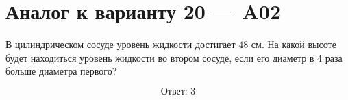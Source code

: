 \documentclass[12pt,a4paper]{article}
\begin{document}
\section*{Аналог к варианту 20 — A02}

В цилиндрическом сосуде уровень жидкости достигает \(48\) см. На какой высоте будет находиться уровень жидкости во втором сосуде, если его диаметр в \(4\) раза больше диаметра первого?

\begin{center}
\end{center}

\[
\boxed{\text{Ответ: }3}
\]
\end{document}
